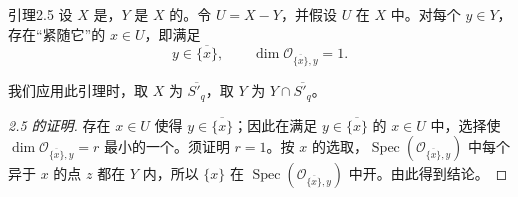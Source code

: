 \begin{SGAresult}{引理}{2.5}
设 $X$ 是，$Y$ 是 $X$ 的。令 $U=X-Y$，并假设 $U$ 在 $X$ 中。对每个 $y\in Y$，存在“紧随它”的 $x\in U$，即满足
\[y\in\overline{\{x\}},\qquad\dim\mathscr O_{\overline{\{x\}},y}=1.\]
\end{SGAresult}
我们应用此引理时，取 $X$ 为 $\overline{S'_q}$，取 $Y$ 为 $Y\cap\overline{S'_q}$。
\begin{proof}[2.5 的证明]
存在 $x\in U$ 使得 $y\in\overline{\{x\}}$；因此在满足 $y\in\overline{\{x\}}$ 的 $x\in U$ 中，选择使 $\dim\mathscr O_{\overline{\{x\}},y}=r$ 最小的一个。须证明 $r=1$。按 $x$ 的选取，$\operatorname{Spec}(\mathscr O_{\overline{\{x\}},y})$ 中每个异于 $x$ 的点 $z$ 都在 $Y$ 内，所以 $\{x\}$ 在 $\operatorname{Spec}(\mathscr O_{\overline{\{x\}},y})$ 中开。由此得到结论。
\end{proof}
